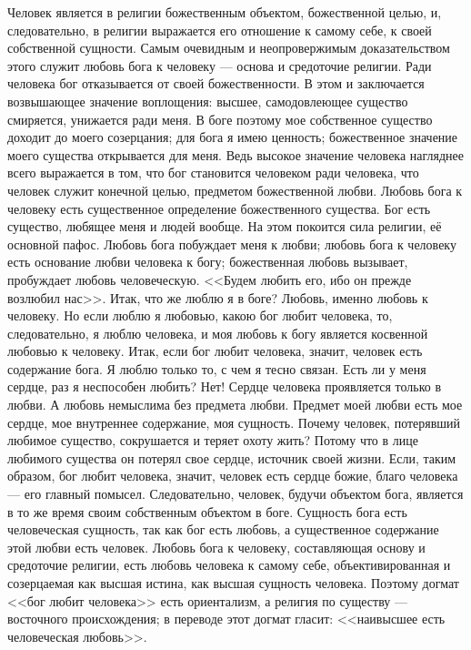 \documentclass[12pt,oneside]{book}
\begin{document}
Человек является в религии божественным объектом, божественной целью, и, следовательно, в религии выражается его отношение к самому себе, к своей собственной сущности. Самым очевидным и неопровержимым доказательством этого служит любовь бога к человеку --- основа и средоточие религии. Ради человека бог отказывается от своей божественности. В этом и заключается возвышающее значение воплощения: высшее, самодовлеющее существо смиряется, унижается ради меня. В боге поэтому мое собственное существо доходит до моего созерцания; для бога я имею ценность; божественное значение моего существа открывается для меня. Ведь высокое значение человека нагляднее всего выражается в том, что бог становится человеком ради человека, что человек служит конечной целью, предметом божественной любви. Любовь бога к человеку есть существенное определение божественного существа. Бог есть существо, любящее меня и людей вообще. На этом покоится сила религии, её основной пафос. Любовь бога побуждает меня к любви; любовь бога к человеку есть основание любви человека к богу; божественная любовь вызывает, пробуждает любовь человеческую. <<Будем любить его, ибо он прежде возлюбил нас>>\ddag\let\svthefootnote\thefootnote\let\thefootnote\relax{}\let\thefootnote\svthefootnote. Итак, что же люблю я в боге? Любовь, именно любовь к человеку. Но если люблю я любовью, какою бог любит человека, то, следовательно, я люблю человека, и моя любовь к богу является косвенной любовью к человеку. Итак, если бог любит человека, значит, человек есть содержание бога. Я люблю только то, с чем я тесно связан. Есть ли у меня сердце, раз я неспособен любить? Нет! Сердце человека проявляется только в любви. А любовь немыслима без предмета любви. Предмет моей любви есть мое сердце, мое внутреннее содержание, моя сущность. Почему человек, потерявший любимое существо, сокрушается и теряет охоту жить? Потому что в лице любимого существа он потерял свое сердце, источник своей жизни. Если, таким образом, бог любит человека, значит, человек есть сердце божие, благо человека --- его главный помысел. Следовательно, человек, будучи объектом бога, является в то же время своим собственным объектом в боге. Сущность бога есть человеческая сущность, так как бог есть любовь, а существенное содержание этой любви есть человек. Любовь бога к человеку, составляющая основу и средоточие религии, есть любовь человека к самому себе, объективированная и созерцаемая как высшая истина, как высшая сущность человека. Поэтому догмат <<бог любит человека>> есть ориентализм, а религия по существу --- восточного происхождения; в переводе этот догмат гласит: <<наивысшее есть человеческая любовь>>.
\end{document}
